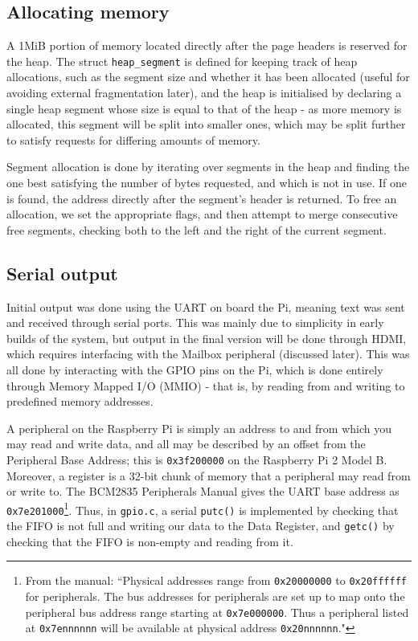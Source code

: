 \documentclass[10pt,a4paper]{article}
\newcommand{\code}[1]{\texttt{#1}}
\begin{document}
\subsection*{Allocating memory}
A 1MiB portion of memory located directly after the page headers is reserved for
the heap. The struct \code{heap\_segment} is defined for keeping track of heap
allocations, such as the segment size and whether it has been allocated (useful
for avoiding external fragmentation later), and the heap is initialised by
declaring a single heap segment whose size is equal to that of the heap - as
more memory is allocated, this segment will be split into smaller ones, which
may be split further to satisfy requests for differing amounts of memory.

Segment allocation is done by iterating over segments in the heap and finding
the one best satisfying the number of bytes requested, and which is not in use.
If one is found, the address directly after the segment's header is returned.
To free an allocation, we set the appropriate flags, and then attempt to merge
consecutive free segments, checking both to the left and the right of the
current segment.

\subsection*{Serial output}
Initial output was done using the UART on board the Pi, meaning text was sent
and received through serial ports. This was mainly due to simplicity in early
builds of the system, but output in the final version will be done through HDMI,
which requires interfacing with the Mailbox peripheral (discussed later). This
was all done by interacting with the GPIO pins on the Pi, which is done entirely
through Memory Mapped I/O (MMIO) - that is, by reading from and writing to
predefined memory addresses. 

A peripheral on the Raspberry Pi is simply an address to and from which you may
read and write data, and all may be described by an offset from the Peripheral
Base Address; this is \code{0x3f200000} on the Raspberry Pi 2 Model B. Moreover,
a register is a 32-bit chunk of memory that a peripheral may read from or write
to. The BCM2835 Peripherals Manual gives the UART base address as
\code{0x7e201000}\footnote{From the manual: ``Physical addresses range from
\code{0x20000000} to \code{0x20ffffff} for peripherals. The bus addresses for
peripherals are set up to map onto the peripheral bus address range starting at
\code{0x7e000000}. Thus a peripheral listed at \code{0x7ennnnnn} will be
available at physical address \code{0x20nnnnnn}."}. Thus, in \code{gpio.c}, a
serial \code{putc()} is implemented by checking that the FIFO is not full and
writing our data to the Data Register, and \code{getc()} by checking that the
FIFO is non-empty and reading from it.
\end{document}
